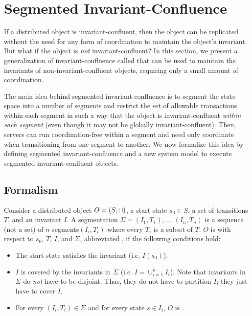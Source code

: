 \section{Segmented Invariant-Confluence}
If a distributed object is invariant-confluent, then the object can be
replicated without the need for any form of coordination to maintain the
object's invariant. But what if the object is \emph{not} invariant-confluent?
In this section, we present a generalization of invariant-confluence called
 that can be used to maintain the
invariants of non-invariant-confluent objects, requiring only a small amount of
coordination.

The main idea behind segmented invariant-confluence is to segment the state
space into a number of segments and restrict the set of allowable transactions
within each segment in such a way that the object is invariant-confluent
\emph{within each segment} (even though it may not be globally
invariant-confluent). Then, servers can run coordination-free within a segment
and need only coordinate when transitioning from one segment to another. We now
formalize this idea by defining segmented invariant-confluence and a new system
model to execute segmented invariant-confluent objects.

\subsection{Formalism}
Consider a distributed object $O = (S, \sqcup)$, a start state $s_0 \in S$, a
set of transitions $T$, and an invariant $I$. A segmentation $\Sigma = (I_1,
T_1), \ldots, (I_n, T_n)$ is a sequence (not a set) of $n$ segments$(I_i, T_i)$
where every $T_i$ is a subset of $T$. $O$ is  with respect to $s_0$, $T$, $I$, and $\Sigma$, abbreviated
, if the following conditions hold:
\begin{itemize}
  \item
    The start state satisfies the invariant (i.e. $I(s_0)$).

  \item
    $I$ is covered by the invariants in $\Sigma$ (i.e. $I = \cup_{i=1}^n I_i$).
    Note that invariants in $\Sigma$ do \emph{not} have to be disjoint. Thus,
    they do not have to partition $I$; they just have to cover $I$.

  \item
    For every $(I_i, T_i) \in \Sigma$ and for every state $s \in I_i$, $O$ is
    .
\end{itemize}


